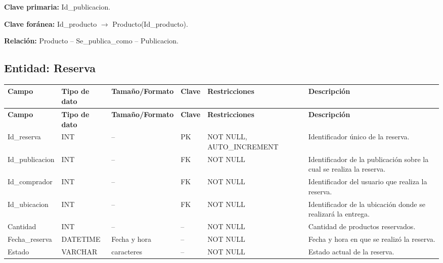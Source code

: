 \documentclass[12pt]{article} %
\begin{document}
\textbf{Clave primaria:} Id\_publicacion.

\textbf{Clave foránea:}
Id\_producto $\rightarrow$ Producto(Id\_producto).

\textbf{Relación:}
Producto -- Se\_publica\_como -- Publicacion.



\subsection{Entidad: Reserva}

\begin{longtable}{>{\raggedright\arraybackslash}p{2.5cm}
                  >{\raggedright\arraybackslash}p{2.0cm}
                  >{\raggedright\arraybackslash}p{2.2cm}
                  >{\raggedright\arraybackslash}p{1.2cm}
                  >{\raggedright\arraybackslash}p{3.0cm}
                  >{\raggedright\arraybackslash}p{4.0cm}}
\toprule
\textbf{Campo} &
\textbf{Tipo de dato} &
\textbf{Tamaño/Formato} &
\textbf{Clave} &
\textbf{Restricciones} &
\textbf{Descripción} \\
\midrule
\endfirsthead

\toprule
\textbf{Campo} &
\textbf{Tipo de dato} &
\textbf{Tamaño/Formato} &
\textbf{Clave} &
\textbf{Restricciones} &
\textbf{Descripción} \\
\midrule
\endhead

Id\_reserva &
INT &
-- &
PK &
NOT NULL, AUTO\_INCREMENT &
Identificador único de la reserva. \\

Id\_publicacion &
INT &
-- &
FK &
NOT NULL &
Identificador de la publicación sobre la cual se realiza la reserva. \\

Id\_comprador &
INT &
-- &
FK &
NOT NULL &
Identificador del usuario que realiza la reserva. \\

Id\_ubicacion &
INT &
-- &
FK &
NOT NULL &
Identificador de la ubicación donde se realizará la entrega. \\

Cantidad &
INT &
-- &
-- &
NOT NULL &
Cantidad de productos reservados. \\

Fecha\_reserva &
DATETIME &
Fecha y hora &
-- &
NOT NULL &
Fecha y hora en que se realizó la reserva. \\

Estado &
VARCHAR &
20 caracteres &
-- &
NOT NULL &
Estado actual de la reserva. \\

\bottomrule
\end{longtable}
\end{document}
